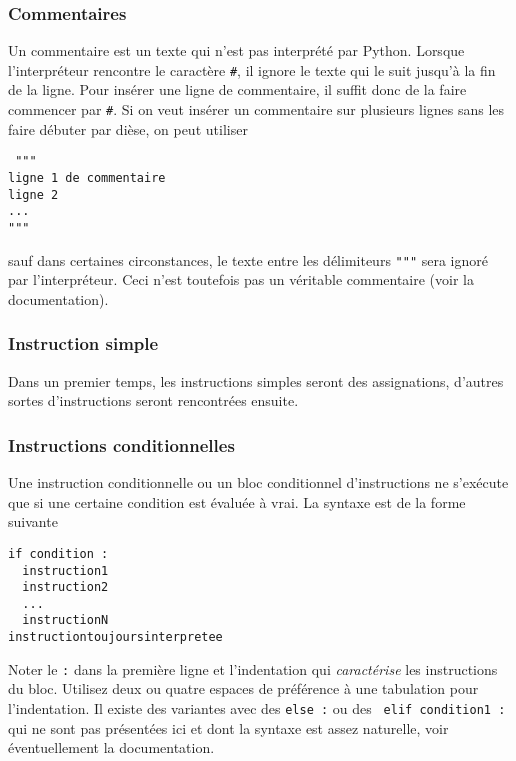 \subsubsection{Commentaires}
Un commentaire est un texte qui n'est pas interprété par Python. Lorsque l'interpréteur rencontre le caractère \verb|#|, il ignore le texte qui le suit jusqu'à la fin de la ligne. Pour insérer une ligne de commentaire, il suffit donc de la faire commencer par \verb|#|.\newline
Si on veut insérer un commentaire sur plusieurs lignes sans les faire débuter par dièse, on peut utiliser 
\begin{verbatim}
 """
ligne 1 de commentaire
ligne 2
...
"""
\end{verbatim}
sauf dans certaines circonstances, le texte entre les délimiteurs \verb|"""| sera ignoré par l'interpréteur. Ceci n'est toutefois pas un véritable commentaire (voir la documentation). 

\subsubsection{Instruction simple}
Dans un premier temps, les instructions simples seront des assignations, d'autres sortes d'instructions seront rencontrées ensuite.
\subsubsection{Instructions conditionnelles}
Une instruction conditionnelle ou un bloc conditionnel d'instructions ne s'exécute que si une certaine condition est évaluée à vrai. La syntaxe est de la forme suivante
\begin{verbatim}
if condition :
  instruction1
  instruction2
  ...
  instructionN
instructiontoujoursinterpretee
\end{verbatim}
Noter le \verb|:| dans la première ligne et l'indentation qui \emph{caractérise} les instructions du bloc. Utilisez deux ou quatre espaces de préférence à une tabulation pour l'indentation.\newline
Il existe des variantes avec des \verb|else :| ou des \verb| elif condition1 :| qui ne sont pas présentées ici et dont la syntaxe est assez naturelle, voir éventuellement la documentation.


